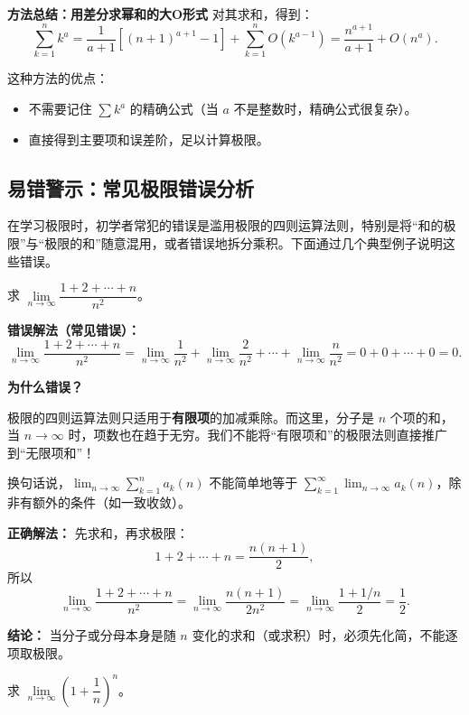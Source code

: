 \documentclass{ctexart}
\newenvironment{custom}[1]{\par\noindent \textbf{#1}\quad}{\par\vspace{1em}}
\begin{document}
\begin{example}[加减结构中的错误示例]
\begin{custom}{方法总结：用差分求幂和的大O形式}
对其求和，得到：
\[
\sum_{k=1}^n k^a = \dfrac{1}{a+1} \left[(n+1)^{a+1} - 1\right] + \sum_{k=1}^n O(k^{a-1}) = \dfrac{n^{a+1}}{a+1} + O(n^a).
\]

这种方法的优点：
\begin{itemize}
\item 不需要记住 \(\sum k^a\) 的精确公式（当 \(a\) 不是整数时，精确公式很复杂）。
\item 直接得到主要项和误差阶，足以计算极限。
\end{itemize}
\end{custom}

\subsection{易错警示：常见极限错误分析}

在学习极限时，初学者常犯的错误是滥用极限的四则运算法则，特别是将“和的极限”与“极限的和”随意混用，或者错误地拆分乘积。下面通过几个典型例子说明这些错误。

\begin{example}[错误：滥用极限的四则运算法则]
求 \(\lim\limits_{n\to\infty} \dfrac{1 + 2 + \cdots + n}{n^2}\)。

\textbf{错误解法（常见错误）：}
\[
\lim_{n\to\infty} \dfrac{1 + 2 + \cdots + n}{n^2} = \lim_{n\to\infty} \dfrac{1}{n^2} + \lim_{n\to\infty} \dfrac{2}{n^2} + \cdots + \lim_{n\to\infty} \dfrac{n}{n^2} = 0 + 0 + \cdots + 0 = 0.
\]

\textbf{为什么错误？}

极限的四则运算法则只适用于\textbf{有限项}的加减乘除。而这里，分子是 \(n\) 个项的和，当 \(n \to \infty\) 时，项数也在趋于无穷。我们不能将“有限项和”的极限法则直接推广到“无限项和”！

换句话说，\(\lim_{n\to\infty} \sum_{k=1}^{n} a_k(n)\) 不能简单地等于 \(\sum_{k=1}^{\infty} \lim_{n\to\infty} a_k(n)\)，除非有额外的条件（如一致收敛）。

\textbf{正确解法：}
先求和，再求极限：
\[
1 + 2 + \cdots + n = \dfrac{n(n+1)}{2},
\]
所以
\[
\lim_{n\to\infty} \dfrac{1 + 2 + \cdots + n}{n^2} = \lim_{n\to\infty} \dfrac{n(n+1)}{2n^2} = \lim_{n\to\infty} \dfrac{1 + 1/n}{2} = \dfrac{1}{2}.
\]

\textbf{结论：} 当分子或分母本身是随 \(n\) 变化的求和（或求积）时，必须先化简，不能逐项取极限。
\end{example}

\begin{example}[错误：拆分乘积中的无穷小量]
求 \(\lim\limits_{n\to\infty} \left(1 + \dfrac{1}{n}\right)^n\)。


\end{example}
\end{example}
\end{document}
